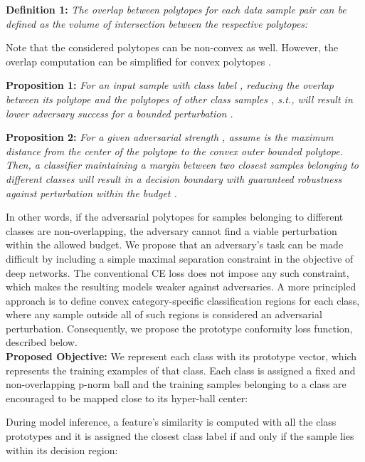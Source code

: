 \documentclass[10pt,twocolumn,letterpaper]{article}
\begin{document}
\noindent
\textbf{Definition 1:} \emph{The overlap  between polytopes for each data sample pair  can be defined as the volume of intersection between the respective polytopes:}


\noindent Note that the considered polytopes can be non-convex as well. However, the overlap computation can be simplified for convex polytopes \cite{de1998computing}. 

\noindent
\textbf{Proposition 1:} \emph{For an  input sample  with class label , reducing the overlap  between its polytope  and the polytopes of other class samples , s.t.,  will result in lower adversary success for a bounded perturbation .}


\noindent
\textbf{Proposition 2:} \emph{For a given adversarial strength , assume  is the maximum distance from the center of the polytope to the convex outer bounded polytope. Then, a classifier maintaining a margin  between two closest samples belonging to different classes will result in a decision boundary with guaranteed robustness against perturbation within the budget .}

In other words, if the adversarial polytopes for samples belonging to different classes are non-overlapping, the adversary cannot find a viable perturbation within the allowed budget. We propose that an adversary's task can be made difficult by including a simple maximal separation constraint in the objective of deep networks. The conventional CE loss does not impose any such constraint, which makes the resulting models weaker against adversaries.
A more principled approach is to define convex category-specific classification regions for each class, where any sample outside all of such regions is considered an adversarial perturbation. Consequently, we propose the prototype conformity loss function, described below. \\

\vspace{-0.5em}
\noindent \textbf{Proposed Objective:} We represent each class with its prototype vector, which represents the training examples of that class.  Each class is assigned a fixed and non-overlapping p-norm ball and the training samples belonging to a class  are encouraged to be mapped close to its hyper-ball center:
\vspace{-0.55em}

During model inference, a feature's similarity is computed with all the class prototypes and it is assigned the closest class label if and only if the sample lies within its decision region: 
\vspace{-0.95em}
\end{document}
